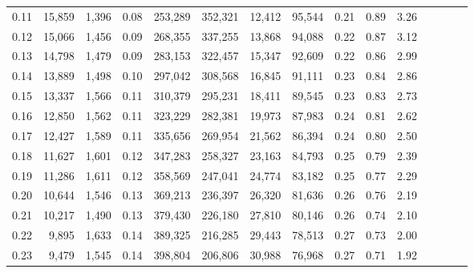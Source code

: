 \begin{tabular}{rrrcrrrrrrrrrrr}
0.11 &  15,859 &   1,396 &                                       0.08 &  253,289 &  352,321 &   12,412 &   95,544 &  0.21 &  0.89 &                         3.26 \\
0.12 &  15,066 &   1,456 &                                       0.09 &  268,355 &  337,255 &   13,868 &   94,088 &  0.22 &  0.87 &                         3.12 \\
0.13 &  14,798 &   1,479 &                                       0.09 &  283,153 &  322,457 &   15,347 &   92,609 &  0.22 &  0.86 &                         2.99 \\
0.14 &  13,889 &   1,498 &                                       0.10 &  297,042 &  308,568 &   16,845 &   91,111 &  0.23 &  0.84 &                         2.86 \\
0.15 &  13,337 &   1,566 &                                       0.11 &  310,379 &  295,231 &   18,411 &   89,545 &  0.23 &  0.83 &                         2.73 \\
0.16 &  12,850 &   1,562 &                                       0.11 &  323,229 &  282,381 &   19,973 &   87,983 &  0.24 &  0.81 &                         2.62 \\
0.17 &  12,427 &   1,589 &                                       0.11 &  335,656 &  269,954 &   21,562 &   86,394 &  0.24 &  0.80 &                         2.50 \\
0.18 &  11,627 &   1,601 &                                       0.12 &  347,283 &  258,327 &   23,163 &   84,793 &  0.25 &  0.79 &                         2.39 \\
0.19 &  11,286 &   1,611 &                                       0.12 &  358,569 &  247,041 &   24,774 &   83,182 &  0.25 &  0.77 &                         2.29 \\
0.20 &  10,644 &   1,546 &                                       0.13 &  369,213 &  236,397 &   26,320 &   81,636 &  0.26 &  0.76 &                         2.19 \\
0.21 &  10,217 &   1,490 &                                       0.13 &  379,430 &  226,180 &   27,810 &   80,146 &  0.26 &  0.74 &                         2.10 \\
0.22 &   9,895 &   1,633 &                                       0.14 &  389,325 &  216,285 &   29,443 &   78,513 &  0.27 &  0.73 &                         2.00 \\
0.23 &   9,479 &   1,545 &                                       0.14 &  398,804 &  206,806 &   30,988 &   76,968 &  0.27 &  0.71 &                         1.92 \\

\end{tabular}
